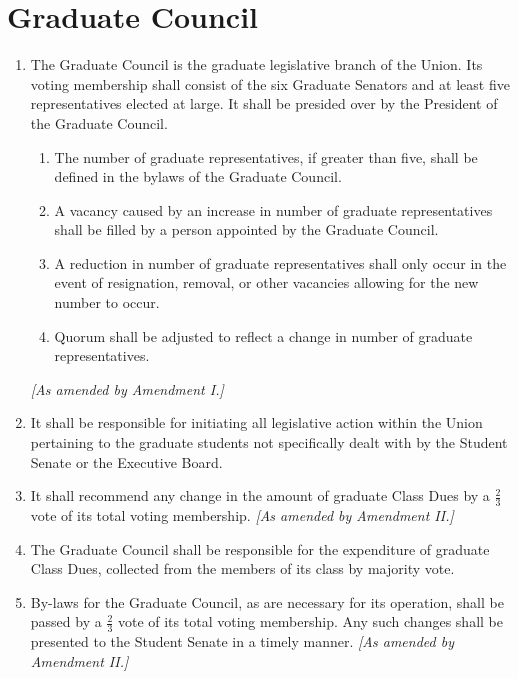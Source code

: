 \section{Graduate Council}
\begin{enumerate}
\item The Graduate Council is the graduate legislative branch of the Union. Its voting membership shall consist of the six Graduate Senators and at least five representatives elected at large. It shall be presided over by the President of the Graduate Council.
\begin{enumerate}
\item The number of graduate representatives, if greater than five, shall be defined in the bylaws of the Graduate Council.
\item A vacancy caused by an increase in number of graduate representatives shall be filled by a person appointed by the Graduate Council.
\item A reduction in number of graduate representatives shall only occur in the event of resignation, removal, or other vacancies allowing for the new number to occur.
\item Quorum shall be adjusted to reflect a change in number of graduate representatives.
\end{enumerate} \textit{[As amended by Amendment I.]}
\item It shall be responsible for initiating all legislative action within the Union pertaining to the graduate students not specifically dealt with by the Student Senate or the Executive Board.
\item It shall recommend any change in the amount of graduate Class Dues by a $\frac{2}{3}$ vote of its total voting membership. \textit{[As amended by Amendment II.]}
\item The Graduate Council shall be responsible for the expenditure of graduate Class Dues, collected from the members of its class by majority vote.
\item By-laws for the Graduate Council, as are necessary for its
operation, shall be passed by a $\frac{2}{3}$ vote of its total voting membership. Any such changes shall be presented to the Student Senate in a timely manner. \textit{[As amended by Amendment II.]}
\end{enumerate}

